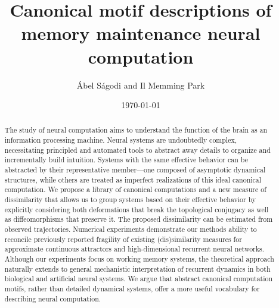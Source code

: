 \documentclass{article}
\title{Canonical motif descriptions of memory maintenance neural computation}
\author{\'Abel S\'agodi and Il Memming Park}
\date{\today}
\theoremstyle{definition} \newtheorem{definition}{Definition}  \newtheorem{example}{Example}
\theoremstyle{remark} \newtheorem{remark}{Remark}
\newcounter{ct}
\begin{document}
\maketitle


\begin{abstract}
The study of neural computation aims to understand the function of the brain as an information processing machine.
Neural systems are undoubtedly complex, necessitating principled and automated tools to abstract away details to organize and incrementally build intuition.
Systems with the same effective behavior can be abstracted by their representative member---one composed of asymptotic dynamical structures, while others are treated as imperfect realizations of this ideal canonical computation.
We propose a library of canonical computations and a new measure of dissimilarity that allows us to group systems based on their effective behavior by explicitly considering both deformations that break the topological conjugacy as well as diffeomorphisms that preserve it.
The proposed dissimilarity can be estimated from observed trajectories.
Numerical experiments demonstrate our methods ability to reconcile previously reported fragility of existing (dis)similarity measures for approximate continuous attractors and high-dimensional recurrent neural networks.
Although our experiments focus on working memory systems, the theoretical approach naturally extends to general mechanistic interpretation of recurrent dynamics in both biological and artificial neural systems.
We argue that abstract canonical computation motifs, rather than detailed dynamical systems, offer a more useful vocabulary for describing neural computation.
%

\end{abstract}
\end{document}
